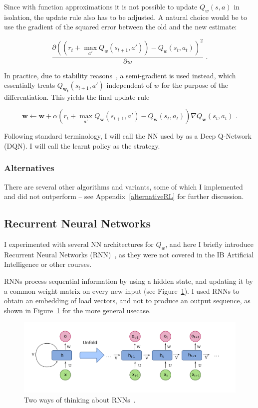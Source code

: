 Since with function approximations it is not possible to update $Q_w(s, a)$ in isolation, the update rule also has to be adjusted. A natural choice would be to use the gradient of the squared error between the old and the new estimate:

$$\frac{\partial (( r_t + \max_{a'} Q_w(s_{t+1}, a')) - Q_w(s_t,a_t))^2}{\partial w} \text{ .}$$

In practice, due to stability reasons~\cite{barnard1993semigradient}, a semi-gradient is used instead, which essentially treats $Q_{\mathbf{w_t}}(s_{t+1}, a')$ independent of $w$ for the purpose of the differentiation. This yields the final update rule


\begin{equation} \label{eq:deep-q-learning-update-with-semi-gradient}
\mathbf{w} \leftarrow \mathbf{w} + \alpha\left( r_t+ \max_{a'} Q_{\mathbf{w}}(s_{t+1}, a') - Q_{\mathbf{w}}(s_t,a_t)\right)\nabla Q_{\mathbf{w}}(s_{t}, a_t) \text{ .}
\end{equation}

Following standard terminology, I will call the NN used by \DQL as a Deep Q-Network (DQN). I will call the learnt policy as the \DQN strategy.

\subsubsection*{Alternatives}

There are several other algorithms and variants, some of which I implemented and did not outperform \DQL -- see Appendix~\ref{alternativeRL} for further discussion.


\subsection{Recurrent Neural Networks} \label{RNN}


I experimented with several NN architectures for $Q_w$, and here I briefly introduce Recurrent Neural Networks (RNN)~\cite{hopfield1982RNNoriginal}, as they were not covered in the IB Artificial Intelligence or other courses.

RNNs process sequential information by using a hidden state, and updating it by a common weight matrix on every new input (see Figure~\ref{RNN-image}). I used RNNs to obtain an embedding of load vectors, and not to produce an output sequence, as shown in Figure~\ref{RNN-image} for the more general usecase.

\begin{figure}[ht]
    \centering
    \includegraphics[scale=0.2]{Chapter2/Figs/RNN.png}
    \caption{Two ways of thinking about RNNs~\cite{RNN}.}
     \label{RNN-image}
\end{figure}



